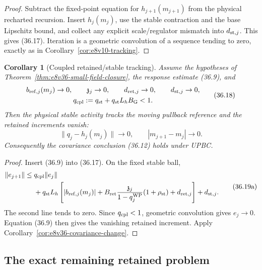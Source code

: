 \documentclass[11pt,oneside]{book}
\newtheorem{corollary}[theorem]{Corollary}
\theoremstyle{definition}
\theoremstyle{remark}
\begin{document}
\begin{proof}
Subtract the fixed-point equation for \(h_{j+1}(m_{j+1})\) from the
physical recharted recursion.  Insert \(h_j(m_j)\), use the stable
contraction and the base Lipschitz bound, and collect any explicit
scale/regulator mismatch into \(d_{{\rm st},j}\).  This gives
(36.17).  Iteration is a geometric convolution of a sequence tending
to zero, exactly as in
Corollary~\ref{cor:e8v10-tracking}.
\end{proof}

\begin{corollary}[Coupled retained/stable tracking]
\label{cor:e8v36-tracking}
Assume the hypotheses of
Theorem~\ref{thm:e8v36-small-field-closure}, the response estimate
(36.9), and
\[
 \begin{gathered}
 b_{{\rm ref},j}(m_j)\to0,\qquad
 {\mathfrak z}_j\to0,\qquad
 d_{{\rm ret},j}\to0,\qquad d_{{\rm st},j}\to0,\\
 q_{\rm cpl}:=
 q_{\rm st}+q_{\rm st}L_hB_{\rm G}<1.
 \end{gathered}                                                   \tag{36.18}
\]
Then the physical stable activity tracks the moving pullback
reference and the retained increments vanish:
\[
 \|q_j-h_j(m_j)\|\longrightarrow0,\qquad
 |m_{j+1}-m_j|\longrightarrow0.                                 \tag{36.19}
\]
Consequently the covariance conclusion (36.12) holds under UPBC.
\end{corollary}

\begin{proof}
Insert (36.9) into (36.17).  On the fixed stable ball,
\[
\begin{split}
 \|e_{j+1}\|
 \leq{}&q_{\rm cpl}\|e_j\|\\
 &+q_{\rm st}L_h\left[
 |b_{{\rm ref},j}(m_j)|
 +B_{\rm ret}\frac{{\mathfrak z}_j}{1-q_j^{\rm WP}}
 (1+\rho_{\rm st})
 +d_{{\rm ret},j}\right]
 +d_{{\rm st},j}.
\end{split}                                                       \tag{36.19a}
\]
The second line tends to zero.  Since \(q_{\rm cpl}<1\), geometric
convolution gives \(e_j\to0\).  Equation (36.9) then gives the
vanishing retained increment.  Apply
Corollary~\ref{cor:e8v36-covariance-change}.
\end{proof}

\subsection{The exact remaining retained problem}
\end{document}
